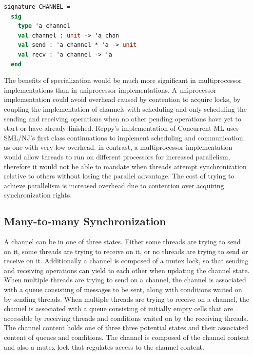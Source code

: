 \documentclass[10pt]{article}
\begin{document}
\begin{lstlisting}[language=ML, mathescape]
  signature CHANNEL =
  sig
    type 'a channel 
    val channel : unit -> 'a chan
    val send : 'a channel * 'a -> unit
    val recv : 'a channel -> 'a
  end     
\end{lstlisting}

The benefits of specialization would be much more significant in multiprocessor
implementations than in uniprocessor implementations. A uniprocessor
implementation could avoid overhead caused by contention to acquire locks, by coupling the
implementation of channels with scheduling and only scheduling the sending and receiving
operations when no other pending operations have yet to start or have already finished.
Reppy's implementation of
Concurrent ML uses SML/NJ's first class continuations to implement scheduling and communication
as one with very low overhead. in contrast, a multiprocessor
implementation would allow threads to run
on different processors for increased parallelism,
therefore it would not be able to mandate when
threads attempt synchronization relative to others without losing the parallel advantage.
The cost of trying to achieve parallelism
is increased overhead due to contention over acquiring
synchronization rights. 



\subsection{Many-to-many Synchronization}
A channel can be in one of three states.  Either some threads are trying to send on it,
some threads are trying to receive on it, or no threads are trying to send or receive on it.
Additionally a channel is composed of a mutex lock,
so that sending and receiving operations can yield
to each other when updating the channel state. When multiple threads are trying to send on a
channel, the channel is associated with a queue consisting of messages to be sent, along with
conditions waited on by sending threads. When multiple threads are trying to receive on a
channel, the channel is associated with a queue consisting of
initially empty cells that are accessible by receiving threads and
conditions waited on by the receiving threads.
The channel content holds one of three three potential states and their
associated content of queues and conditions.
The channel is composed of the channel content and also a mutex lock that regulates access to
the channel content.
\end{document}

